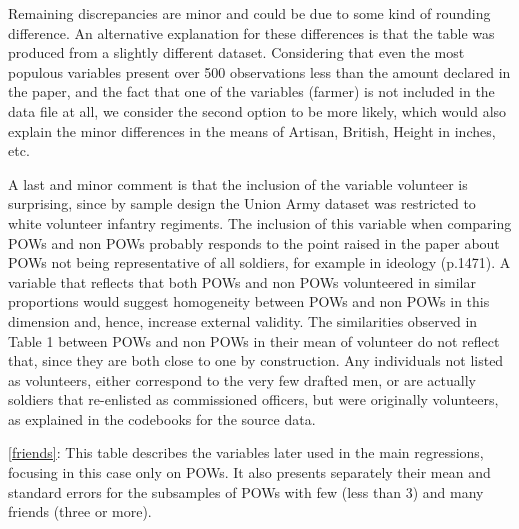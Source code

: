 \documentclass{article}
\begin{document}
Remaining discrepancies are minor and could be due to some kind of rounding difference. An alternative explanation for these differences is that the table was produced from a slightly different dataset. Considering that even the most populous variables present over 500 observations less than the amount declared in the paper, and the fact that one of the variables (farmer) is not included in the data file at all, we consider the second option to be more likely, which would also explain the minor differences in the means of Artisan, British, Height in inches, etc.

A last and minor comment is that the inclusion of the variable volunteer is surprising, since by sample design the Union Army dataset was restricted to white volunteer infantry regiments. The inclusion of this variable when comparing POWs and non POWs probably responds to the point raised in the paper about POWs not being representative of all soldiers, for example in ideology (p.1471). A variable that reflects that both POWs and non POWs volunteered in similar proportions would suggest homogeneity between POWs and non POWs in this dimension and, hence, increase  external validity. The similarities observed in Table 1 between POWs and non POWs in their mean of volunteer do not reflect that, since they are both close to one by construction. Any individuals not listed as volunteers, either correspond to the very few drafted men, or are actually soldiers that re-enlisted as commissioned officers, but were originally volunteers, as explained in the codebooks for the source data.

\autoref{friends}: This table describes the variables later used in the main regressions, focusing in this case only on POWs.  It also presents separately their mean and standard errors for the subsamples of POWs with few (less than 3) and many friends (three or more). 
\end{document}
